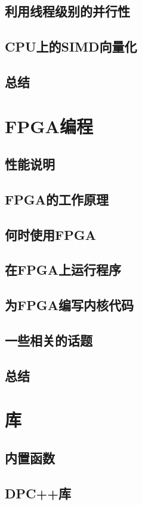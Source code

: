 \documentclass[11pt,a4paper,UTF8]{ctexart}
\begin{document}
		\subsection{利用线程级别的并行性}
		\subsection{CPU上的SIMD向量化}
		\subsection{总结}
	\section{FPGA编程}
		\subsection{性能说明}
		\subsection{FPGA的工作原理}
		\subsection{何时使用FPGA}
		\subsection{在FPGA上运行程序}
		\subsection{为FPGA编写内核代码}
		\subsection{一些相关的话题}
		\subsection{总结}
	\section{库}
		\subsection{内置函数}
		\subsection{DPC++库}
\end{document}
